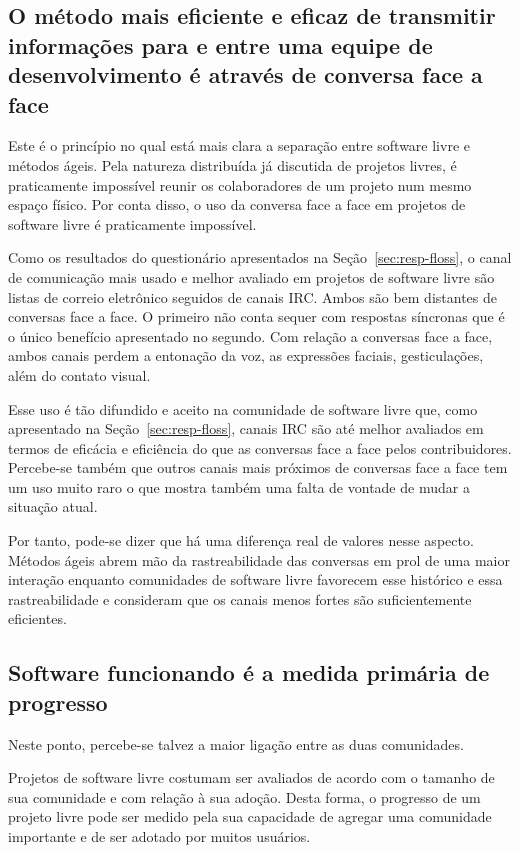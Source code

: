 \subsection[Conversa face a face]{O método mais eficiente e eficaz de
  transmitir informações para e entre uma equipe de desenvolvimento é
  através de conversa face a face}

Este é o princípio no qual está mais clara a separação entre software
livre e métodos ágeis. Pela natureza distribuída já discutida de
projetos livres, é praticamente impossível reunir os colaboradores de
um projeto num mesmo espaço físico. Por conta disso, o uso da conversa
face a face em projetos de software livre é praticamente impossível.

Como os resultados do questionário apresentados na
Seção~\ref{sec:resp-floss}, o canal de comunicação mais usado e melhor
avaliado em projetos de software livre são listas de correio
eletrônico seguidos de canais IRC. Ambos são bem distantes de
conversas face a face. O primeiro não conta sequer com respostas
síncronas que é o único benefício apresentado no segundo. Com relação
a conversas face a face, ambos canais perdem a entonação da voz, as
expressões faciais, gesticulações, além do contato visual.

Esse uso é tão difundido e aceito na comunidade de software livre que,
como apresentado na Seção~\ref{sec:resp-floss}, canais IRC são até
melhor avaliados em termos de eficácia e eficiência do que as
conversas face a face pelos contribuidores. Percebe-se também que
outros canais mais próximos de conversas face a face tem um uso muito
raro o que mostra também uma falta de vontade de mudar a situação
atual.

Por tanto, pode-se dizer que há uma diferença real de valores nesse
aspecto. Métodos ágeis abrem mão da rastreabilidade das conversas em
prol de uma maior interação enquanto comunidades de software livre
favorecem esse histórico e essa rastreabilidade e consideram que os
canais menos fortes são suficientemente eficientes.

\subsection[Software funcionando]{Software funcionando é a medida
  primária de progresso}

Neste ponto, percebe-se talvez a maior ligação entre as duas
comunidades.

Projetos de software livre costumam ser avaliados de acordo com o
tamanho de sua comunidade e com relação à sua adoção. Desta forma, o
progresso de um projeto livre pode ser medido pela sua capacidade de
agregar uma comunidade importante e de ser adotado por muitos
usuários.

